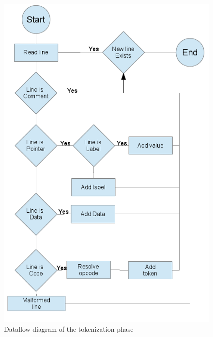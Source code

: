 \documentclass{article}
\begin{document}
\newpage

\begin{figure}[H]
\begin{centering}
\includegraphics[width=\textwidth,height=\textheight,keepaspectratio]{lexicographical_flow.png}
\caption{Dataflow diagram of the tokenization phase}
\end{centering}
\end{figure}

\newpage
\end{document}
